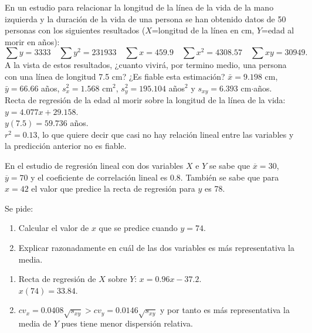 {En un estudio para relacionar la longitud de la línea de la vida de la mano izquierda y la duración de la vida de una
persona se han obtenido datos de 50 personas con los siguientes resultados ($X$=longitud de la línea en cm, $Y$=edad al
morir en años):
\[
\sum y=3333 \quad \sum y^2=231933 \quad \sum x=459.9 \quad \sum x^2=4308.57 \quad \sum xy=30949.
\]
A la vista de estos resultados, ¿cuanto vivirá, por termino medio, una persona con una línea de longitud 7.5 cm?
¿Es fiable esta estimación?  }
{$\bar x=9.198$ cm, $\bar y=66.66$ años, $s_x^2=1.568$ cm$^2$, $s_y^2=195.104$ años$^2$ y $s_{xy}=6.393$
cm$\cdot$años.\\
Recta de regresión de la edad al morir sobre la longitud de la línea de la vida: $y=4.077x+29.158$.\\
$y(7.5)=59.736$ años.\\
$r^2=0.13$, lo que quiere decir que casi no hay relación lineal entre las variables y la predicción anterior no es
fiable.}
{}


{En el estudio de regresión lineal con dos variables $X$ e $Y$ se sabe que $\overline{x}=30$, $\overline{y}=70$ y el
coeficiente de correlación lineal es $0.8$.
También se sabe que para $x=42$ el valor que predice la recta de regresión para $y$ es 78.

Se pide:
\begin{enumerate}
\item Calcular el valor de $x$ que se predice cuando $y=74$.
\item Explicar razonadamente en cuál de las dos variables es más representativa la media.
\end{enumerate}
}
{
\begin{enumerate}
\item Recta de regresión de $X$ sobre $Y$: $x=0.96x-37.2$.\\
$x(74)=33.84$.
\item $cv_x=0.0408\sqrt{s_{xy}}>cv_y=0.0146\sqrt{s_{xy}}$ y por tanto es más representativa la media de $Y$ pues tiene
menor dispersión relativa.
\end{enumerate}
}
{}


